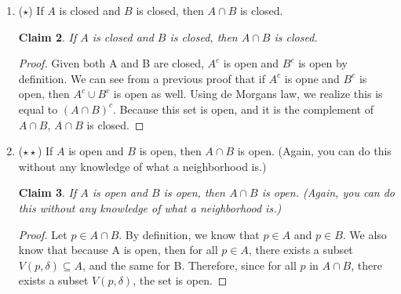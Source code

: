 \documentclass[11pt]{letter}
\newtheorem{claim}{Claim}
\theoremstyle{definition}
\begin{document}
\begin{description}
\begin{enumerate}
\begin{claim}
Given $A_1,\ldots, A_p$ are open sets, then $\displaystyle\bigcup_{k=1}^pA_k$ is an open set.
\end{claim}
\begin{proof}
Through proof by induction, we can determine $\displaystyle\bigcup_{k=1}^pA_k$ is open. We can first verify the base case, which results in $\displaystyle\bigcup_{k=1}^1A_k=A_1$, which is true based on the definition of $A_1$. Defining $j=p$, we will show that $\displaystyle\bigcup_{k=1}^jA_k$ is open for j+1:
\begin{align*}
\displaystyle\bigcup_{k=1}^{j+1}A_k&=\displaystyle\bigcup_{k=1}^{j+1}A_k\\
&=\displaystyle\bigcup_{k=1}^pA_k\cup A_{j+1}\\
&=\displaystyle\bigcup_{k=1}^pA_k\cup A_{j+1}\\
\end{align*}
According to our inductive assumption, $\displaystyle\bigcup_{k=1}^jA_k$ is an open set, as well as $A_{j+1}$ by definition (they defined $A_1,A_2,...A_p$, and the next term $A_{p+1}$ as open). Since we proved in the previous proof that the union of two open sets is open, by proof of mathematical induction $\displaystyle\bigcup_{k=1}^pA_k$ is open.
\end{proof}
			\item ($\star$) If $A$ is closed and $B$ is closed, then $A\cap B$ is closed.
\begin{claim}
If $A$ is closed and $B$ is closed, then $A\cap B$ is closed.
\end{claim}
\begin{proof}
Given both A and B are closed, $A^c$ is open and $B^c$ is open by definition. We can see from a previous proof that if $A^c$ is opne and $B^c$ is open, then $A^c\cup B^c$ is open as well. Using de Morgans law, we realize this is equal to $(A\cap B)^c$. Because this set is open, and it is the complement of $A\cap B$, $A\cap B$ is closed.
\end{proof}
			\item ($\star \star$) If $A$ is open and $B$ is open, then $A\cap B$ is open. (Again, you can do this without any knowledge of what a neighborhood is.)
\begin{claim}
If $A$ is open and $B$ is open, then $A\cap B$ is open. (Again, you can do this without any knowledge of what a neighborhood is.)
\end{claim}
\begin{proof}
Let $p\in A\cap B$. By definition, we know that $p\in A$ and $p\in B$. We also know that because A is open, then for all $p\in A$, there exists a subset $V(p,\delta)\subseteq A$, and the same for B. Therefore, since for all $p$ in $A\cap B$, there exists a subset $V(p,\delta)$, the set is open.
\end{proof}
	
			\end{enumerate}

\end{description}
\end{document}
